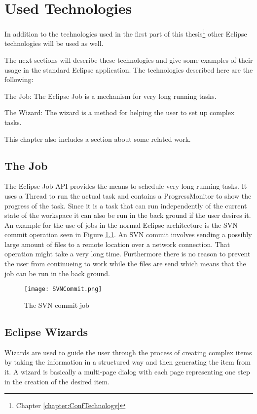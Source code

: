 \chapter{Used Technologies}
\label{chapter:AutoTechnologies}
In addition to the technologies used in the first part of this
thesis\footnote{Chapter \ref{chapter:ConfTechnology}} other Eclipse
technologies will be used as well.

The next sections will describe these technologies and give some
examples of their usage in the standard Eclipse application.
The technologies described here are the following:
\begin{description}
 \item The Job: The Eclipse Job is a mechanism for very long running tasks.
 \item The Wizard: The wizard is a method for helping the user to set up complex tasks.
\end{description}

This chapter also includes a section about some related work.

\section{The Job}
\label{section:AutoTechJob}
The Eclipse Job \ac{API} provides the means to schedule very long running tasks.
It uses a Thread to run the actual task and contains a ProgressMonitor to show
the progress of the task. Since it is a task that can run independently of the
current state of the workspace it can also be run in the back ground if the user
desires it.
An example for the use of jobs in the normal Eclipse architecture
is the \ac{SVN} commit operation seen in Figure \ref{fig:SVNCommit}. An \ac{SVN} commit involves
sending a possibly large amount of files to a remote location over a network connection. That
operation might take a very long time. Furthermore there is no reason to prevent the user from
continueing to work while the files are send which means that the job can be run in the back ground.
\begin{figure}
  \centering
  \texttt{[image: SVNCommit.png]}
  \caption[The SVN commit job]%
  {The SVN commit job\protect}
  \label{fig:SVNCommit}
\end{figure}

\section{Eclipse Wizards}
\label{section:AutoTechWizards}
Wizards are used to guide the user through the process of creating complex items by taking
the information in a structured way and then generating the item from it. A wizard is 
basically a multi-page dialog with each page representing one step in the creation of the 
desired item.

